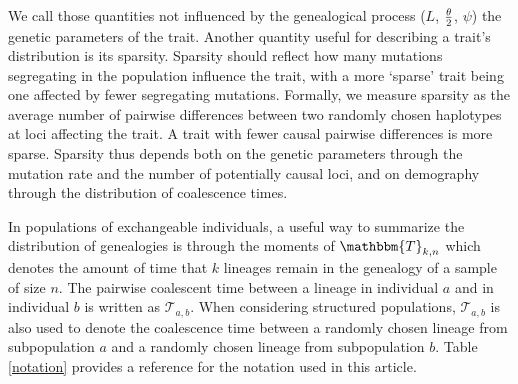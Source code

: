 We call those quantities not influenced by the genealogical process ($L$, $\frac{\theta}{2}$,
$\psi$) the genetic parameters of the trait. Another quantity useful for
describing a trait's distribution is its sparsity. Sparsity should reflect how
many mutations segregating in the population influence the trait, with a more
`sparse' trait being one affected by fewer segregating mutations. Formally, we
measure sparsity as the average number of pairwise differences between two
randomly chosen haplotypes at loci affecting the trait. A trait with fewer
causal pairwise differences is more sparse. Sparsity thus depends both on the
genetic parameters through the mutation rate and the number of potentially
causal loci, and on demography through the distribution of coalescence times.

In populations of exchangeable individuals, a useful way to summarize the
distribution of genealogies is through the moments of $\mathbbm{T}_{k,n}$ which
denotes the amount of time that $k$ lineages remain in the genealogy of a sample
of size $n$. The pairwise coalescent time between a lineage in individual $a$
and in individual $b$ is written as $\mathcal{T}_{a,b}$. When considering
structured populations, $\mathcal{T}_{a,b}$ is also used to denote the
coalescence time between a randomly chosen lineage from subpopulation $a$ and a
randomly chosen lineage from subpopulation $b$. Table \ref{notation} provides a
reference for the notation used in this article. 


